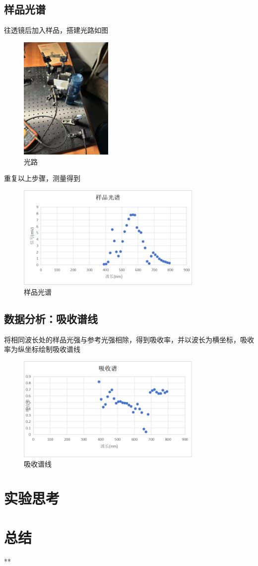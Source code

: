 \documentclass{ctexart}
\begin{document}
\subsection{样品光谱}
往透镜后加入样品，搭建光路如图
\begin{figure}
    \centering
    \includegraphics[width=0.4\textwidth]{pictures/微信图片_20241121154954.jpg}
    \caption{光路}
\end{figure}

重复以上步骤，测量得到
\begin{figure}[H]
    \centering
    \includegraphics[width=0.8\textwidth]{pictures/图片2.png}
    \caption{样品光谱}
\end{figure}

\subsection{数据分析：吸收谱线}
将相同波长处的样品光强与参考光强相除，得到吸收率，并以波长为横坐标，吸收率为纵坐标绘制吸收谱线
\begin{figure}[H]
    \centering
    \includegraphics[width=0.8\textwidth]{pictures/图片3.png}
    \caption{吸收谱线}
\end{figure}

\section{实验思考}

\section{总结}
**
\end{document}
